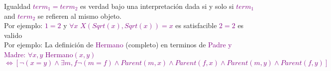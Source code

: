 \begin{frame}{Igualdad}
\textcolor{purple}{$term_{1}=term_{2}$} es verdad bajo una interpretación dada si y solo si \textcolor{purple}{$term_{1}$} and \textcolor{purple}{$term_{2}$} se refieren al mismo objeto.\\
\vspace{1cm} 
Por ejemplo: \textcolor{purple}{$1=2$} y \textcolor{purple}{$\forall x$ $X (Sqrt(x), Sqrt(x)) = x $} es satisfacible \textcolor{purple}{$2=2$} es valido\\
\vspace{1cm} 
Por ejemplo: La definición de \textcolor{purple}{Hermano} (completo) en terminos de  \textcolor{purple}{Padre y Madre:}
\textcolor{purple}{$\forall x,y $ Hermano$(x,y)$ $\Leftrightarrow [\neg (x=y) \land \exists m,f \neg (m=f) \land Parent(m,x) \land Parent(f,x) \land Parent(m,y) \land Parent(f,y)]$}
\end{frame}